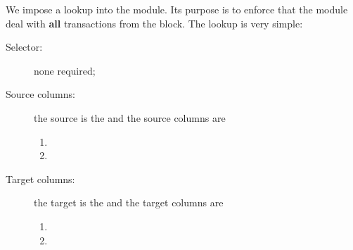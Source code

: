 We impose a lookup into the \hubMod{} module. Its purpose is to enforce that the \hubMod{} module deal with \textbf{all} transactions from the block. The lookup is very simple:
\begin{description}
	\item[Selector:] none required;
	\item[Source columns:]
		the source is the \txnDataMod{} and the source columns are
		\begin{multicols}{2}
			\begin{enumerate}
				\item \locAbs{}
				\item \block{}
			\end{enumerate}
		\end{multicols}
	\item[Target columns:]
		the target is the \txnDataMod{} and the target columns are
		\begin{multicols}{2}
			\begin{enumerate}
				\item \locAbs{}
				\item \block{}
			\end{enumerate}
		\end{multicols}
\end{description}
